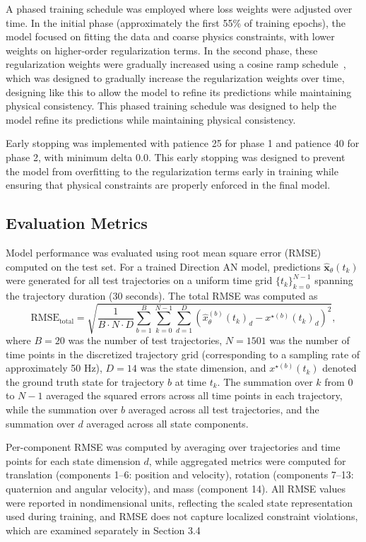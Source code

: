 A phased training schedule was employed where loss weights were adjusted over
time. In the initial phase (approximately the first 55\% of training epochs),
the model focused on fitting the data and coarse physics constraints, with
lower weights on higher-order regularization terms. In the second phase, these
regularization weights were gradually increased using a cosine ramp schedule~\cite{loshchilov2017},
which was designed to gradually increase the regularization weights over time, designing like this 
to allow the model to refine its predictions while maintaining physical
consistency. This phased training schedule was designed to help the model refine 
its predictions while maintaining physical consistency.

Early stopping was implemented with patience 25 for phase 1 and patience 40 for
phase 2, with minimum delta 0.0. This early stopping was designed to prevent the 
model from overfitting to the regularization terms early in training while ensuring that physical
constraints are properly enforced in the final model.


\subsection{Evaluation Metrics}

Model performance was evaluated using root mean square error (RMSE) computed on
the test set. For a trained Direction AN model, predictions
\(\hat{\mathbf{x}}_\theta(t_k)\) were generated for all test trajectories on a
uniform time grid \(\{t_k\}_{k=0}^{N-1}\) spanning the trajectory duration
(30 seconds). The total RMSE was computed as
\[
  \mathrm{RMSE}_\mathrm{total} = \sqrt{\frac{1}{B \cdot N \cdot D} \sum_{b=1}^{B}
  \sum_{k=0}^{N-1} \sum_{d=1}^{D} \left(\hat{x}_\theta^{(b)}(t_k)_d - 
  x^{\star(b)}(t_k)_d\right)^2},
\]
where \(B = 20\) was the number of test trajectories, \(N = 1501\) was the number
of time points in the discretized trajectory grid (corresponding to a sampling
rate of approximately 50 Hz), \(D = 14\) was the state dimension, and
\(x^{\star(b)}(t_k)\) denoted the ground truth state for trajectory \(b\) at time
\(t_k\). The summation over \(k\) from \(0\) to \(N-1\) averaged the squared
errors across all time points in each trajectory, while the summation over \(b\)
averaged across all test trajectories, and the summation over \(d\) averaged across
all state components.

Per-component RMSE was computed by averaging over trajectories and time points
for each state dimension \(d\), while aggregated metrics were computed for
translation (components 1--6: position and velocity), rotation (components
7--13: quaternion and angular velocity), and mass (component 14). All RMSE values
were reported in nondimensional units, reflecting the scaled state
representation used during training, and RMSE does not capture localized constraint 
violations, which are examined separately in Section 3.4

